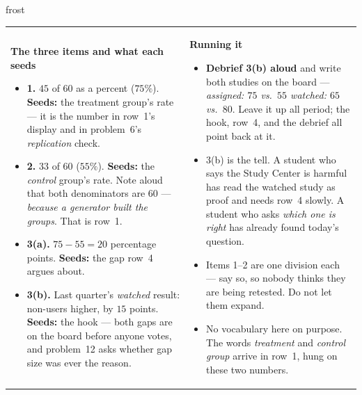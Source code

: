 \documentclass[10pt]{article}
\begin{document}
\begin{fixedskillbox}{frost}
\begin{tabularx}{\linewidth}{@{}X X@{}}
\begin{minipage}[t]{\linewidth}\vspace{0pt}
    \textbf{The three items and what each seeds}
    \begin{itemize}[leftmargin=1.1em, itemsep=1pt, topsep=2pt]
      \item \textbf{1.} $45$ of $60$ as a percent ($75\%$). \textbf{Seeds:} the treatment
            group's rate --- it is the number in row~1's display and in problem~6's
            \emph{replication} check.
      \item \textbf{2.} $33$ of $60$ ($55\%$). \textbf{Seeds:} the \emph{control} group's
            rate. Note aloud that both denominators are $60$ --- \emph{because a generator
            built the groups}. That is row~1.
      \item \textbf{3(a).} $75 - 55 = 20$ percentage points. \textbf{Seeds:} the gap row~4
            argues about.
      \item \textbf{3(b).} Last quarter's \emph{watched} result: non-users higher, by $15$
            points. \textbf{Seeds:} the hook --- both gaps are on the board before anyone
            votes, and problem~12 asks whether gap size was ever the reason.
    \end{itemize}
\end{minipage}
&
\begin{minipage}[t]{\linewidth}\vspace{0pt}
    \textbf{Running it}
    \begin{itemize}[leftmargin=1.1em, itemsep=1pt, topsep=2pt]
      \item \textbf{Debrief 3(b) aloud} and write both studies on the board ---
            \emph{assigned: $75$ vs.\ $55$ \quad watched: $65$ vs.\ $80$}. Leave it up all
            period; the hook, row~4, and the debrief all point back at it.
      \item 3(b) is the tell. A student who says the Study Center is harmful has read the
            watched study as proof and needs row~4 slowly. A student who asks \emph{which one
            is right} has already found today's question.
      \item Items 1--2 are one division each --- say so, so nobody thinks they are being
            retested. Do not let them expand.
      \item No vocabulary here on purpose. The words \emph{treatment} and \emph{control
            group} arrive in row~1, hung on these two numbers.
    \end{itemize}
\end{minipage}
\end{tabularx}
\end{fixedskillbox}
\end{document}
